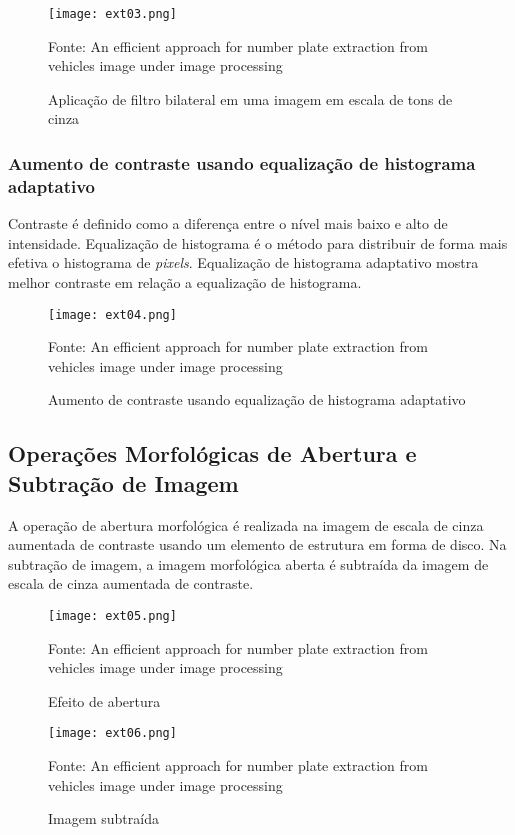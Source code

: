 \begin{figure}[H]
	\centering
	\texttt{[image: ext03.png]}
	\caption{Aplicação de filtro bilateral em uma imagem em escala de tons de cinza}
Fonte: An efficient approach for number plate extraction from vehicles image under image processing~\cite{kaur2014efficient}
	\label{fig:ext_filter_in_gray_scale}
\end{figure}

\subsubsection{Aumento de contraste usando equalização de histograma adaptativo}

Contraste é definido como a diferença entre o nível mais baixo e alto de
intensidade. Equalização de histograma é o método para distribuir de forma mais
efetiva o histograma de \emph{pixels}. Equalização de histograma adaptativo
mostra melhor contraste em relação a equalização de histograma.

\begin{figure}[H]
	\centering
	\texttt{[image: ext04.png]}
	\caption{Aumento de contraste usando equalização de histograma adaptativo}
Fonte: An efficient approach for number plate extraction from vehicles image under image processing~\cite{kaur2014efficient}
	\label{fig:ext_contrast_adaptive_histogram}
\end{figure}

\subsection{Operações Morfológicas de Abertura e Subtração de Imagem}

A operação de abertura morfológica é realizada na imagem de escala de cinza
aumentada de contraste usando um elemento de estrutura em forma de disco. Na
subtração de imagem, a imagem morfológica aberta é subtraída da imagem de escala
de cinza aumentada de contraste.

\begin{figure}[H]
	\centering
	\texttt{[image: ext05.png]}
	\caption{Efeito de abertura}
Fonte: An efficient approach for number plate extraction from vehicles image under image processing~\cite{kaur2014efficient}
	\label{fig:ext_opening_effect}
\end{figure}

\begin{figure}[H]
	\centering
	\texttt{[image: ext06.png]}
	\caption{Imagem subtraída}
Fonte: An efficient approach for number plate extraction from vehicles image under image processing~\cite{kaur2014efficient}
	\label{fig:ext_image_substraction}
\end{figure}

